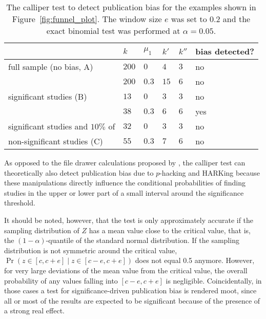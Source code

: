 \begin{table}[h!]
  \begin{center}
    \begin{tabular}{ >{\raggedright\let\\\tabularnewline}p{} | >{\raggedleft\let\\\tabularnewline}p{}| >{\raggedleft\let\\\tabularnewline}p{} | >{\raggedleft\let\\\tabularnewline}p{} | >{\raggedleft\let\\\tabularnewline}p{} | >{\raggedright\let\\\tabularnewline}p{}} 
        \hline
         & $k$\TBstrut & $\mu_1$ & $k'$ & $k''$ & bias detected?\\ 
        \hline
        full sample (no bias, A)\Tstrut & $200$ & $0$ & $4$ & $3$ & no \\ 
        & $200$\Bstrut & $0.3$ & $15$ & $6$ & no\\
        \hline
        significant studies (B)\Tstrut& $13$ & $0$ & $3$ & $3$ & no \\
        & $38$\Bstrut & $0.3$ & $6$ & $6$ & yes \\
        \hline
        significant studies and $10\%$ of\Tstrut & $32$ & $0$ & $3$ & $3$ & no \\
        non-significant studies (C) & $55$\Bstrut & $0.3$ & $7$ & $6$ & no\\
     \hline
    \end{tabular}
    \caption[The calliper test to detect publication bias.]{The calliper test to detect publication bias for the examples shown in Figure~\ref{fig:funnel_plot}. The window size $e$ was set to $0.2$ and the exact binomial test was performed at $\alpha = 0.05$.}
    \label{tab:calliper_test}
  \end{center}
\end{table}
As opposed to the file drawer calculations proposed by \citet{rosenthal_file_1979}, the calliper test can theoretically also detect publication bias due to $p$-hacking and HARKing because these manipulations directly influence the conditional probabilities of finding studies in the upper or lower part of a small interval around the significance threshold.\par
It should be noted, however, that the test is only approximately accurate if the sampling distribution of $Z$ has a mean value close to the critical value, that is, the $(1-\alpha)$-quantile of the standard normal distribution. If the sampling distribution is not symmetric around the critical value, $\Pr(z \in [c,c+e] \mid z \in [c-e,c+e])$ does not equal 0.5 anymore. However, for very large deviations of the mean value from the critical value, the overall probability of any values falling into $[c-e,c+e]$ is negligible. Coincidentally, in those cases a test for significance-driven publication bias is rendered moot, since all or most of the results are expected to be significant because of the presence of a strong real effect. %

